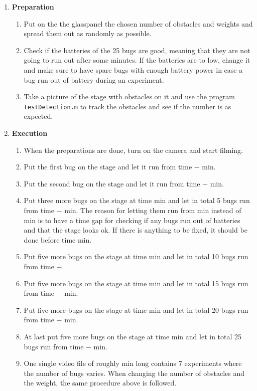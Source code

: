 \begin{enumerate}[label*=\arabic*.]

    \item \textbf{Preparation}
    \begin{enumerate}[label*=\arabic*.]
        \item Put on the the glasspanel the chosen number of obstacles and weights and 
            spread them out as randomly as possible.
        \item Check if the batteries of the 25 bugs are good, meaning that they are not going 
        to run out after some minutes. If the batteries are to low, change it and make sure 
        to have spare bugs with enough battery power in case a bug run out of battery during an 
        experiment.
        \item Take a picture of the stage with obstacles on it and use the \MATLAB program
        \texttt{testDetection.m} to track the obstacles and see if the number is as expected.
    \end{enumerate}
    
    
    \item \textbf{Execution}
    \begin{enumerate}[label*=\arabic*.]
        \item When the preparations are done, turn on the camera and start filming.
        \item Put the first bug on the stage and let it run from time $-$ min.
        \item Put the second bug on the stage and let it run from time $-$ min.
        \item Put three more bugs on the stage at time  min and let in total 
            5 bugs run from time $-$ min. The reason for letting them run 
            from  min instead of  min is to have a time gap for 
            checking if any bugs run out of batteries and that the stage looks ok. If there 
            is anything to be fixed, it should be done before time  min. 
        \item Put five more bugs on the stage at time  min and let in total 
            10 bugs run from time $-$. 
        \item Put five more bugs on the stage at time  min and let in total 
            15 bugs run from time $-$ min. 
        \item Put five more bugs on the stage at time  min and let in total 
            20 bugs run from time $-$ min. 
        \item At last put five more bugs on the stage at time  min and let in total 
            25 bugs run from time $-$ min.
        \item One single video file of roughly  min long contains 7 experiments 
            where the number of bugs varies. When changing the number of obstacles and the 
            weight, the same procedure above is followed.
    \end{enumerate}
    

\end{enumerate}

